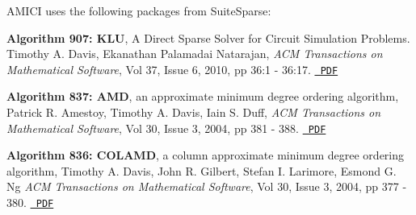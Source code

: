 A\+M\+I\+CI uses the following packages from Suite\+Sparse\+:

{\bfseries{Algorithm 907\+: K\+LU}}, A Direct Sparse Solver for Circuit Simulation Problems. Timothy A. Davis, Ekanathan Palamadai Natarajan, {\itshape A\+CM Transactions on Mathematical Software}, Vol 37, Issue 6, 2010, pp 36\+:1 -\/ 36\+:17. \href{http://dl.acm.org/authorize?305534}{\texttt{ P\+DF}}

{\bfseries{Algorithm 837\+: A\+MD}}, an approximate minimum degree ordering algorithm, Patrick R. Amestoy, Timothy A. Davis, Iain S. Duff, {\itshape A\+CM Transactions on Mathematical Software}, Vol 30, Issue 3, 2004, pp 381 -\/ 388. \href{http://dl.acm.org/authorize?733169}{\texttt{ P\+DF}}

{\bfseries{Algorithm 836\+: C\+O\+L\+A\+MD}}, a column approximate minimum degree ordering algorithm, Timothy A. Davis, John R. Gilbert, Stefan I. Larimore, Esmond G. Ng {\itshape A\+CM Transactions on Mathematical Software}, Vol 30, Issue 3, 2004, pp 377 -\/ 380. \href{http://dl.acm.org/authorize?734450}{\texttt{ P\+DF}} 